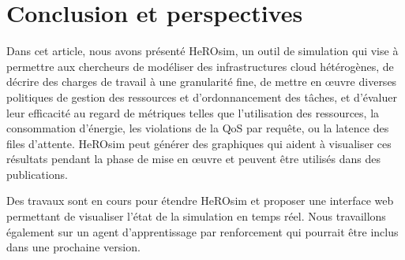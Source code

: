 

\section{Conclusion et perspectives}
\label{section:herosim-conclusion}

Dans cet article, nous avons présenté HeROsim, un outil de simulation qui vise à permettre aux chercheurs de modéliser des infrastructures cloud hétérogènes, de décrire des charges de travail à une granularité fine, de mettre en œuvre diverses politiques de gestion des ressources et d'ordonnancement des tâches, et d'évaluer leur efficacité au regard de métriques telles que l'utilisation des ressources, la consommation d'énergie, les violations de la QoS par requête, ou la latence des files d'attente. HeROsim peut générer des graphiques qui aident à visualiser ces résultats pendant la phase de mise en œuvre et peuvent être utilisés dans des publications.

Des travaux sont en cours pour étendre HeROsim et proposer une interface web permettant de visualiser l'état de la simulation en temps réel. Nous travaillons également sur un agent d'apprentissage par renforcement qui pourrait être inclus dans une prochaine version.
